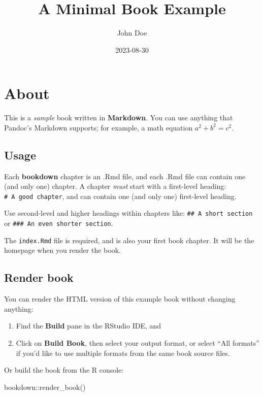 \documentclass[
]{book}
\title{A Minimal Book Example}
\author{John Doe}
\date{2023-08-30}
\newenvironment{Shaded}{\begin{snugshade}}{\end{snugshade}}
\newcommand{\FunctionTok}[1]{\textcolor[rgb]{0.00,0.00,0.00}{#1}}
\newcommand{\NormalTok}[1]{#1}
\newcommand{\SpecialCharTok}[1]{\textcolor[rgb]{0.00,0.00,0.00}{#1}}
\begin{document}
\maketitle

{
\setcounter{tocdepth}{1}
\tableofcontents
}
\hypertarget{about}{%
\chapter{About}\label{about}}

This is a \emph{sample} book written in \textbf{Markdown}. You can use anything that Pandoc's Markdown supports; for example, a math equation \(a^2 + b^2 = c^2\).

\hypertarget{usage}{%
\section{Usage}\label{usage}}

Each \textbf{bookdown} chapter is an .Rmd file, and each .Rmd file can contain one (and only one) chapter. A chapter \emph{must} start with a first-level heading: \texttt{\#\ A\ good\ chapter}, and can contain one (and only one) first-level heading.

Use second-level and higher headings within chapters like: \texttt{\#\#\ A\ short\ section} or \texttt{\#\#\#\ An\ even\ shorter\ section}.

The \texttt{index.Rmd} file is required, and is also your first book chapter. It will be the homepage when you render the book.

\hypertarget{render-book}{%
\section{Render book}\label{render-book}}

You can render the HTML version of this example book without changing anything:

\begin{enumerate}
\def\labelenumi{\arabic{enumi}.}
\item
  Find the \textbf{Build} pane in the RStudio IDE, and
\item
  Click on \textbf{Build Book}, then select your output format, or select ``All formats'' if you'd like to use multiple formats from the same book source files.
\end{enumerate}

Or build the book from the R console:

\begin{Shaded}
\begin{Highlighting}[]
\NormalTok{bookdown}\SpecialCharTok{::}\FunctionTok{render\_book}\NormalTok{()}
\end{Highlighting}
\end{Shaded}
\end{document}
